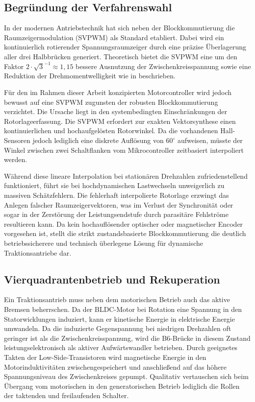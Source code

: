 \subsection{Begründung der Verfahrenswahl}
\label{subsec:verfahrenswahl}
In der modernen Antriebstechnik hat sich neben der Blockkommutierung die Raumzeigermodulation (SVPWM) als Standard etabliert. Dabei wird ein kontinuierlich rotierender Spannungsraumzeiger durch eine präzise Überlagerung aller drei Halbbrücken generiert. Theoretisch bietet die SVPWM eine um den Faktor $2\cdot\sqrt{3}^{-1} \approx 1{,}15$ bessere Ausnutzung der Zwischenkreisspannung sowie eine Reduktion der Drehmomentwelligkeit wie in \cite{Xia2012} beschrieben.

Für den im Rahmen dieser Arbeit konzipierten Motorcontroller wird jedoch bewusst auf eine SVPWM zugunsten der robusten Blockkommutierung verzichtet. Die Ursache liegt in den systembedingten Einschränkungen der Rotorlageerfassung. Die SVPWM erfordert zur exakten Vektorsynthese einen kontinuierlichen und hochaufgelösten Rotorwinkel. Da die vorhandenen Hall-Sensoren jedoch lediglich eine diskrete Auflösung von $60^\circ$ aufweisen, müsste der Winkel zwischen zwei Schaltflanken vom Mikrocontroller zeitbasiert interpoliert werden. 

Während diese lineare Interpolation bei stationären Drehzahlen zufriedenstellend funktioniert, führt sie bei hochdynamischen Lastwechseln unweigerlich zu massiven Schätzfehlern. Die fehlerhaft interpolierte Rotorlage erzwingt das Anlegen falscher Raumzeigervektoren, was im Verlust der Synchronität oder sogar in der Zerstörung der Leistungsendstufe durch parasitäre Fehlströme resultieren kann. Da kein hochauflösender optischer oder magnetischer Encoder vorgesehen ist, stellt die strikt zustandsbasierte Blockkommutierung die deutlich betriebssicherere und technisch überlegene Lösung für dynamische Traktionsantriebe dar.

\subsection{Vierquadrantenbetrieb und Rekuperation}
\label{subsec:rekuperation}
Ein Traktionsantrieb muss neben dem motorischen Betrieb auch das aktive Bremsen beherrschen. Da der BLDC-Motor bei Rotation eine Spannung in den Statorwicklungen induziert, kann er kinetische Energie in elektrische Energie umwandeln.
Da die induzierte Gegenspannung bei niedrigen Drehzahlen oft geringer ist als die Zwischenkreisspannung, wird die B6-Brücke in diesem Zustand leistungselektronisch als aktiver Aufwärtswandler betrieben. Durch geeignetes Takten der Low-Side-Transistoren wird magnetische Energie in den Motorinduktivitäten zwischengespeichert und anschließend auf das höhere Spannungsniveau des Zwischenkreises gepumpt. Qualitativ vertauschen sich beim Übergang vom motorischen in den generatorischen Betrieb lediglich die Rollen der taktenden und freilaufenden Schalter.

